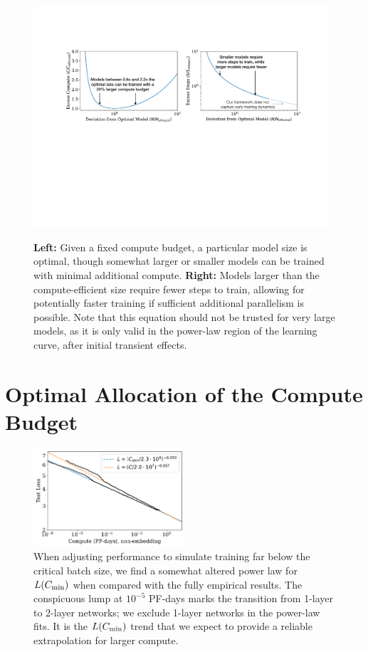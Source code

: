 \documentclass[english]{article}
\begin{document}
\begin{figure}
\noindent \centering{}
\includegraphics[width=0.98\textwidth]{SuboptimalModels}\
\caption[Training on suboptimal models]{\textbf{Left:} Given a fixed compute budget, a particular model size is optimal, though somewhat larger or smaller models can be trained with minimal additional compute. \textbf{Right:} Models larger than the compute-efficient size require fewer steps to train, allowing for potentially faster training if sufficient additional parallelism is possible. Note that this equation should not be trusted for very large models, as it is only valid in the power-law region of the learning curve, after initial transient effects.  \label{fig:SubOptimalModels}}
\end{figure}


\section{Optimal Allocation of the Compute Budget}
\label{sec:OptimalCompute}

\begin{figure}
\centering{}
\includegraphics[width=0.5\textwidth]{ComputeEfficientFrontierWithAdjustment}  
\caption[Comparison between empirical and adjusted compute trends]{
When adjusting performance to simulate training far below the critical batch size, we find a somewhat altered power law for $L(C_{\rm min})$ when compared with the fully empirical results.  The conspicuous lump at $10^{-5}$ PF-days marks the transition from 1-layer to 2-layer networks; we exclude 1-layer networks in the power-law fits.  It is the $L(C_{\rm min})$ trend that we expect to provide a reliable extrapolation for larger compute.
\label{fig:ComputeEfficientAdjusted}}
\end{figure}
\end{document}
